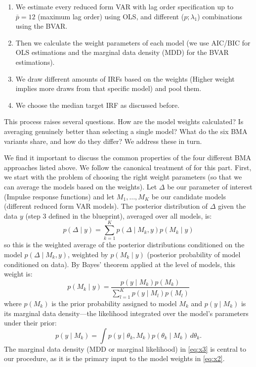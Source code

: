 \documentclass[12pt, a4paper]{article}
\begin{document}
\begin{enumerate}
    \item We estimate every reduced form VAR with lag order specification up to $\bar p =12$ (maximum lag order) using OLS, and different ($p ; \lambda_1$) combinations using the BVAR.
    \item Then we calculate the weight parameters of each model (we use AIC/BIC for OLS estimations and the marginal data density (MDD) for the BVAR estimations).
    \item We draw different amounts of IRFs based on the weights (Higher weight implies more draws from that specific model) and pool them. 
    \item We choose the median target IRF as discussed before.
\end{enumerate}

This process raises several questions. How are the model weights calculated? Is averaging genuinely better than selecting a single model? What do the six BMA variants share, and how do they differ? We address these in turn.

We find it important to discuss the common properties of the four different BMA approaches listed above. We follow the canonical treatment of \citet{hoetingBayesianModelAveraging1999} for this part. First, we start with the problem of choosing the right weight parameters (so that we can average the models based on the weights). Let $\Delta$ be our parameter of interest (Impulse response functions) and let $M_1,\dots,M_K$ be our candidate models (different reduced form VAR models). The posterior distribution of $\Delta$ given the data $y$ (step 3 defined in the blueprint), averaged over all models, is:
\begin{equation} \label{eq:x1}
p(\Delta \mid y) = \sum_{k=1}^{K} p(\Delta \mid M_k, y) p(M_k \mid y)
\end{equation}
so this is the weighted average of the posterior distributions conditioned on the model $p(\Delta \mid M_k, y)$, weighted by $p(M_k \mid y)$ (posterior probability of model conditioned on data). By Bayes' theorem applied at the level of models, this weight is:
\begin{equation} \label{eq:x2}
p(M_k \mid y) = \frac{p(y \mid M_k) p(M_k)}{\sum_{l=1}^{K} p(y \mid M_l) p(M_l)}
\end{equation}
where $p(M_k)$ is the prior probability assigned to model $M_k$ and $p(y \mid M_k)$ is its marginal data density---the likelihood integrated over the model's parameters under their prior:
\begin{equation} \label{eq:x3}
p(y \mid M_k) = \int p(y \mid \theta_k, M_k) p(\theta_k \mid M_k) \, d\theta_k.
\end{equation}
The marginal data density (MDD or marginal likelihood) in \eqref{eq:x3} is central to our procedure, as it is the primary input to the model weights in \eqref{eq:x2}.
\end{document}

